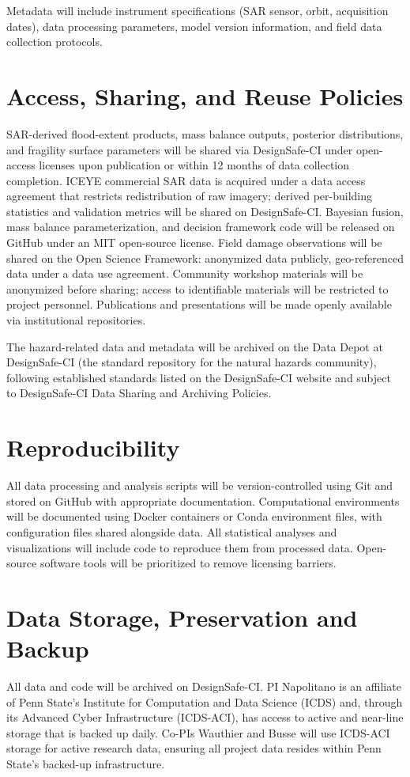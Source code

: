 \documentclass[11pt]{article}
\begin{document}
Metadata will include instrument specifications (SAR sensor, orbit, acquisition dates),
data processing parameters, model version information, and field data collection
protocols.

\vspace{0.3cm}
\section{Access, Sharing, and Reuse Policies}
SAR-derived flood-extent products, mass balance outputs, posterior distributions,
and fragility surface parameters will be shared via DesignSafe-CI under open-access
licenses upon publication or within 12 months of data collection completion.
ICEYE commercial SAR data is acquired under a data access agreement that restricts
redistribution of raw imagery; derived per-building statistics and validation
metrics will be shared on DesignSafe-CI.
Bayesian fusion, mass balance parameterization, and decision framework code will
be released on GitHub under an MIT open-source license.
Field damage observations will be shared on the Open Science Framework: anonymized
data publicly, geo-referenced data under a data use agreement.
Community workshop materials will be anonymized before sharing; access to
identifiable materials will be restricted to project personnel.
Publications and presentations will be made openly available via institutional
repositories.

The hazard-related data and metadata will be archived on the Data Depot at
DesignSafe-CI (the standard repository for the natural hazards community), following
established standards listed on the DesignSafe-CI website and subject to
DesignSafe-CI Data Sharing and Archiving Policies.

\section{Reproducibility}
All data processing and analysis scripts will be version-controlled using Git and
stored on GitHub with appropriate documentation.
Computational environments will be documented using Docker containers or Conda
environment files, with configuration files shared alongside data.
All statistical analyses and visualizations will include code to reproduce them from
processed data.
Open-source software tools will be prioritized to remove licensing barriers.

\section{Data Storage, Preservation and Backup}
All data and code will be archived on DesignSafe-CI.
PI Napolitano is an affiliate of Penn State's Institute for Computation and Data
Science (ICDS) and, through its Advanced Cyber Infrastructure (ICDS-ACI), has access
to active and near-line storage that is backed up daily.
Co-PIs Wauthier and Busse will use ICDS-ACI storage for active research data,
ensuring all project data resides within Penn State's backed-up infrastructure.
\end{document}
